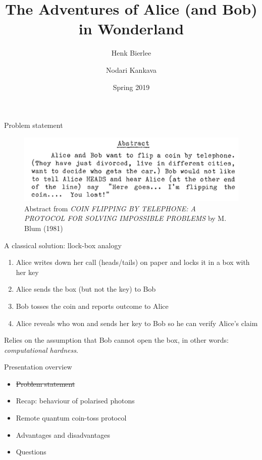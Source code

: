\documentclass{beamer}
\title{The Adventures of Alice (and Bob) in Wonderland}
\author{Henk Bierlee \and Nodari Kankava}
\institute{Uppsala University}
\date{Spring 2019}
\begin{document}



 
\frame{\titlepage}
 
\begin{frame}{Problem statement}

\begin{figure}
    \centering
    \includegraphics{blum-abstract}
    \caption{Abstract from \emph{COIN FLIPPING BY TELEPHONE: A PROTOCOL FOR SOLVING IMPOSSIBLE PROBLEMS} by M. Blum (1981)}
    \label{fig:blum-abstract}
\end{figure}

\end{frame}

\begin{frame}{A classical solution:  llock-box analogy}

\begin{enumerate}
    \item Alice writes down her call (heads/tails) on paper and locks it in a box with her key
    \item Alice sends the box (but not the key) to Bob
    \item Bob tosses the coin and reports outcome to Alice
    \item Alice reveals who won and sends her key to Bob so he can verify Alice's claim
\end{enumerate}

Relies on the assumption that Bob cannot open the box, in other words: \emph{computational hardness}.


\end{frame}

\begin{frame}{Presentation overview}

\begin{itemize}
    \item \sout{Problem statement}
    \vfill
    \item Recap: behaviour of polarised photons
    \vfill
    \item Remote quantum coin-toss protocol
    \vfill
    \item Advantages and disadvantages
    \vfill
    \item Questions
    \vfill
\end{itemize}

\end{frame}
\end{document}
